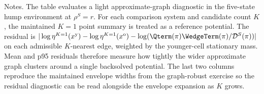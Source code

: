 \begin{table}[t]
\centering
\caption{Light approximate-graph backsolve diagnostics}
\label{tab:approximate-integrability}
\footnotesize
\renewcommand{\arraystretch}{1.08}
\begin{minipage}{0.96\textwidth}
\footnotesize Notes. The table evaluates a light approximate-graph diagnostic in the five-state hump environment at $\rho^{S}=r$. For each comparison system and candidate count $K$, the maintained $K=1$ point summary is treated as a reference potential. The residual is $|\log \eta^{K=1}(x^{\mathrm y})-\log \eta^{K=1}(x^{\mathrm o})-\log(\Qterm(\pi)\WedgeTerm(\pi)/\mathcal{D}^{S}(\pi))|$ on each admissible $K$-nearest edge, weighted by the younger-cell stationary mass. Mean and p95 residuals therefore measure how tightly the wider approximate graph clusters around a single backsolved potential. The last two columns reproduce the maintained envelope widths from the graph-robust exercise so the residual diagnostic can be read alongside the envelope expansion as $K$ grows.
\end{minipage}
\end{table}
